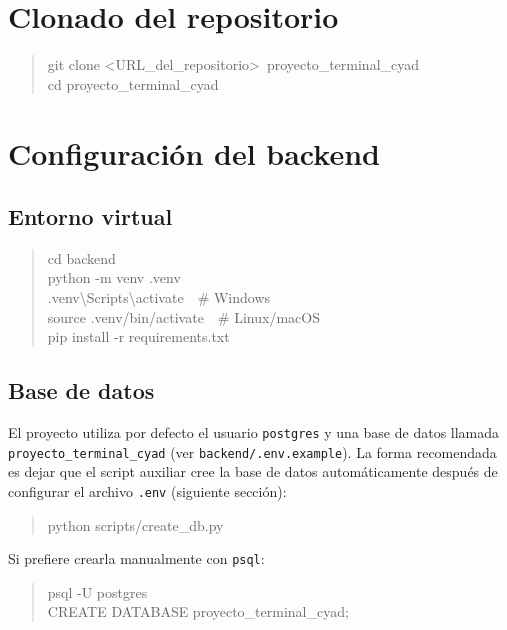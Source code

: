 \documentclass{computacion}
\begin{document}
\section{Clonado del repositorio}

\begin{quote}
\ttfamily
git clone \textless URL\_del\_repositorio\textgreater\ proyecto\_terminal\_cyad \\
cd proyecto\_terminal\_cyad
\end{quote}

\section{Configuración del backend}

\subsection{Entorno virtual}

\begin{quote}
\ttfamily
cd backend \\
python -m venv .venv \\
.venv\textbackslash Scripts\textbackslash activate\ \ \# Windows \\
source .venv/bin/activate\ \ \# Linux/macOS \\
pip install -r requirements.txt
\end{quote}

\subsection{Base de datos}

El proyecto utiliza por defecto el usuario \texttt{postgres} y una base de datos llamada \texttt{proyecto\_terminal\_cyad} (ver \texttt{backend/.env.example}). La forma recomendada es dejar que el script auxiliar cree la base de datos automáticamente después de configurar el archivo \texttt{.env} (siguiente sección):

\begin{quote}
\ttfamily
python scripts/create\_db.py
\end{quote}

Si prefiere crearla manualmente con \texttt{psql}:

\begin{quote}
\ttfamily
psql -U postgres \\
CREATE DATABASE proyecto\_terminal\_cyad;
\end{quote}
\end{document}
